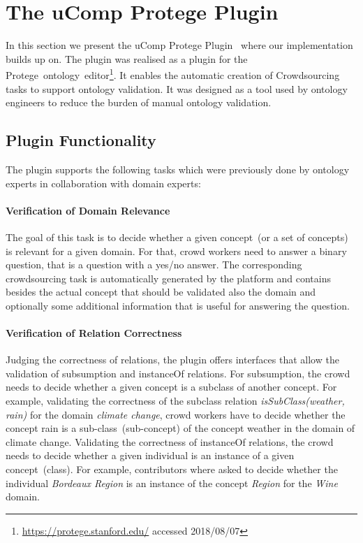 \section{The uComp Protege Plugin}\label{sec:ucomp_protege_plugin}
In this section we present the uComp Protege Plugin~\cite{wohlgenannt2016} where our implementation builds up on. The plugin was realised as a plugin for the Protege~ontology~editor\footnote{\url{https://protege.stanford.edu/} accessed 2018/08/07}. It enables the automatic creation of Crowdsourcing tasks to support ontology validation. It was designed as a tool used by ontology engineers to reduce the burden of manual ontology validation.

\subsection{Plugin Functionality}\label{sec:ucomp_protege_plugin_functionality}
The plugin supports the following tasks which were previously done by ontology experts in collaboration with domain experts:

\paragraph{Verification of Domain Relevance}
The goal of this task is to decide whether a given concept~(or a set of concepts) is relevant for a given domain. For that, crowd workers need to
answer a binary question, that is a question with a yes/no answer. The corresponding crowdsourcing task is automatically generated by the platform and
contains besides the actual concept that should be validated also the domain and optionally some additional information that is useful for answering 
the question. 

\paragraph{Verification of Relation Correctness}
Judging the correctness of relations, the plugin offers interfaces that allow the validation of subsumption and instanceOf relations. 
For subsumption, the crowd needs to decide whether a given concept is a subclass of another concept. For example, validating the correctness
of the subclass relation \emph{isSubClass(weather, rain)} for the domain \emph{climate change}, crowd workers have to decide whether the concept rain is a sub-class~(sub-concept) of the concept weather in the domain of climate change. Validating the correctness of instanceOf relations, the crowd needs to decide whether a given individual is an instance of a given concept~(class). For example, contributors where asked to decide whether the individual \emph{Bordeaux Region} is an instance of the concept \emph{Region} for the \emph{Wine} domain. 


